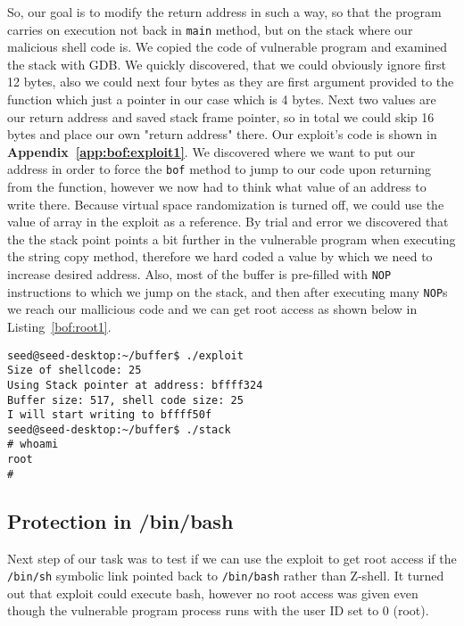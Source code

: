 \documentclass[12pt, a4paper, pdflatex]{article}
\begin{document}
So, our goal is to modify the return address in such a way, so that the program carries on execution not back in \texttt{main} method, but on the stack where our malicious shell code is. We copied the code of vulnerable program and examined the stack with GDB. We quickly discovered, that we could obviously ignore first 12 bytes, also we could next four bytes as they are first argument provided to the function which just a pointer in our case which is 4 bytes. Next two values are our return address and saved stack frame pointer, so in total we could skip 16 bytes and place our own "return address" there. Our exploit's code is shown in \textbf{Appendix~\ref{app:bof:exploit1}}.
We discovered where we want to put our address in order to force the \texttt{bof} method to jump to our code upon returning from the function, however we now had to think what value of an address to write there. Because virtual space randomization is turned off, we could use the value of  array in the exploit as a reference. By trial and error we discovered that the the stack point points a bit further in the vulnerable program when executing the string copy method, therefore we hard coded a value by which we need to increase desired address. Also, most of the buffer is pre-filled with \texttt{NOP} instructions to which we jump on the stack, and then after executing many \texttt{NOP}s we reach our mallicious code and we can get root access as shown below in Listing~\ref{bof:root1}.
\vspace{1em}
\lstset{
	captionpos=b,
	frame=single,
	language=BASH,
	breaklines=true,
	caption=Function with buffer overflow vulnerability,
	label=bof:root1,
  float=tb
}
\begin{lstlisting}
seed@seed-desktop:~/buffer$ ./exploit 
Size of shellcode: 25
Using Stack pointer at address: bffff324
Buffer size: 517, shell code size: 25
I will start writing to bffff50f
seed@seed-desktop:~/buffer$ ./stack 
# whoami                                                                       
root
# 
\end{lstlisting}


\subsection{Protection in /bin/bash}

Next step of our task was to test if we can use the exploit to get root access if
the \texttt{/bin/sh} symbolic link pointed back to \texttt{/bin/bash} rather than Z-shell. It turned out that exploit could execute bash, however no root access was given even though the vulnerable program  process runs with the user ID set to 0 (root). 
\end{document}

